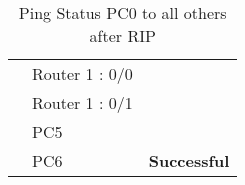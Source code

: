 \documentclass[a4paper,11pt]{article}
\begin{document}
\begin{enumerate}
\begin{table}[H]
\begin{tabular}{| m{10em}| m{10em}| m{10em} |}
                  {\cellcolor[rgb]{0.141,0.525,1}}                                & Router 1 : 0/0       & {\cellcolor[rgb]{0.42,0.988,0.827}}                                        \\
                  \hhline{|>{\arrayrulecolor[rgb]{0.141,0.525,1}}->{\arrayrulecolor{black}}->{\arrayrulecolor[rgb]{0.42,0.988,0.827}}->{\arrayrulecolor{black}}|}
                  {\cellcolor[rgb]{0.141,0.525,1}}                                & Router 1 : 0/1       & {\cellcolor[rgb]{0.42,0.988,0.827}}                                        \\
                  \hhline{|>{\arrayrulecolor[rgb]{0.141,0.525,1}}->{\arrayrulecolor{black}}->{\arrayrulecolor[rgb]{0.42,0.988,0.827}}->{\arrayrulecolor{black}}|}
                  {\cellcolor[rgb]{0.141,0.525,1}}                                & PC5                  & {\cellcolor[rgb]{0.42,0.988,0.827}}                                        \\
                  \hhline{|>{\arrayrulecolor[rgb]{0.141,0.525,1}}->{\arrayrulecolor{black}}->{\arrayrulecolor[rgb]{0.42,0.988,0.827}}->{\arrayrulecolor{black}}|}
                  \multirow{-10}{*}{{\cellcolor[rgb]{0.141,0.525,1}}\textbf{PC0}} & PC6                  & \multirow{-10}{*}{{\cellcolor[rgb]{0.42,0.988,0.827}} \textbf{Successful}} \\
                  \hline
              \end{tabular}
              \caption{ Ping Status PC0 to all others after RIP}
          \end{table}


          \begin{table}[H]
              \centering


\end{table}
\end{enumerate}
\end{document}

